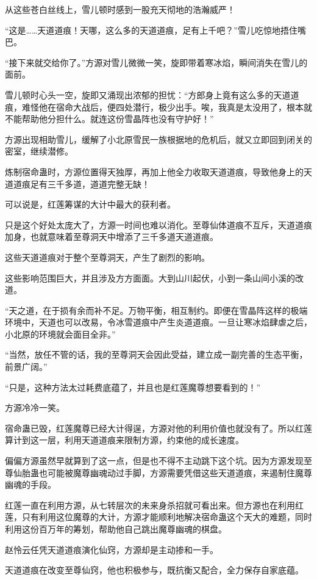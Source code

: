 \begin{this_body}
从这些苍白丝线上，雪儿顿时感到一股充天彻地的浩瀚威严！

“这是……天道道痕！天哪，这么多的天道道痕，足有上千吧？”雪儿吃惊地捂住嘴巴。

“接下来就交给你了。”方源对雪儿微微一笑，旋即带着寒冰焰，瞬间消失在雪儿的面前。

雪儿顿时心头一空，旋即又涌现出浓郁的担忧：“方郎身上竟有这么多的天道道痕，难怪他在宿命大战后，便四处潜行，极少出手。唉，我真是太没用了，根本就不能帮助他分担什么。就连这份雪晶阵也没有守护好！”

方源出现相助雪儿，缓解了小北原雪民一族根据地的危机后，就又立即回到闭关的密室，继续潜修。

炼制宿命蛊时，方源位置得天独厚，再加上他全力收取天道道痕，导致他身上的天道道痕足有三千多道，道道完整无缺！

可以说是，红莲筹谋的大计中最大的获利者。

只是这个好处太庞大了，方源一时间也难以消化。至尊仙体道痕不互斥，天道道痕加身，也就意味着至尊洞天中增添了三千多道天道道痕。

这些天道道痕对于整个至尊洞天，产生了剧烈的影响。

这些影响范围巨大，并且涉及方方面面。大到山川起伏，小到一条山间小溪的改道。

“天之道，在于损有余而补不足。万物平衡，相互制约。即便在雪晶阵这样的极端环境中，天道也可以改易，令冰雪道痕中产生炎道道痕。一旦让寒冰焰肆虐之后，小北原的环境就会面目全非。”

“当然，放任不管的话，我的至尊洞天会因此受益，建立成一副完善的生态平衡，前景广阔。”

“只是，这种方法太过耗费底蕴了，并且也是红莲魔尊想要看到的！”

方源冷冷一笑。

宿命蛊已毁，红莲魔尊已经大计得逞，方源对他的利用价值也就没有了。所以红莲算计到这一层，利用天道道痕来限制方源，约束他的成长速度。

偏偏方源虽然早就算到了这一点，但是也不得不主动跳下这个坑。因为方源发现至尊仙胎蛊也可能被魔尊幽魂动过手脚，方源需要凭借这些天道道痕，来遏制住魔尊幽魂的手段。

红莲一直在利用方源，从七转层次的未来身杀招就可看出来。但方源也在利用红莲，只有利用这位魔尊的大计，方源才能顺利地解决宿命蛊这个天大的难题，同时利用这份百万年的筹划，帮助他自己跳出魔尊幽魂的棋盘。

赵怜云任凭天道道痕演化仙窍，方源却是主动掺和一手。

天道道痕在改变至尊仙窍，他也积极参与，既抗衡又配合，全力保存自家底蕴。


\end{this_body}
